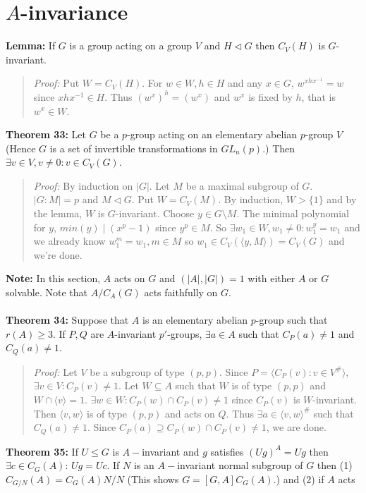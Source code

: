 \section {$A$-invariance}
{\bf Lemma:}
If $G$ is a group acting on a group $V$ and $H \lhd G$ then $C_V(H)$ is $G$-invariant.
\begin{quote}
\emph{Proof:}  Put $W= C_V(H)$.  For $w \in W, h \in H$ and any $x \in G$, $w^{xhx^{-1}} = w$ since
$xhx^{-1} \in H$.  Thus  $(w^x)^h = (w^x)$ and $w^x$ is fixed by $h$, that is $w^x \in W$.
\end{quote}
{\bf Theorem 33:}
Let $G$ be a $p$-group acting on an elementary abelian $p$-group $V$ (Hence $G$ is a set of
invertible transformations in $GL_n(p)$.)  Then $\exists v \in V, v \ne 0: v \in C_V(G)$.
\begin{quote}
\emph{Proof:}  By induction on $|G|$.  Let $M$ be a maximal subgroup of $G$.  $|G:M|= p$ and $M \lhd G$.
Put $W= C_V(M)$.  By induction, $W > \{1 \}$ and by the lemma, $W$ is $G$-invariant.
Choose $y \in G \setminus M$.  The minimal polynomial for $y$, $min(y) \mid (x^p-1)$ since
$y^p \in M$.  So $\exists w_1 \in W, w_1 \ne 0: w_1^y = w_1$ and we already know
$w_1^m = w_1, m \in M$ so $w_1 \in C_V( \langle y, M \rangle)= C_V(G)$ and we're done.
\end{quote}
{\bf Note:} In this section, $A$ acts on $G$ and $(|A|, |G|)=1$ with either
$A$ or $G$ solvable.  Note that $A/C_A(G)$ acts faithfully on $G$.
\\
\\
{\bf Theorem 34:}
Suppose that $A$ is an elementary abelian $p$-group such that $r(A) \ge 3$.  If $P, Q$ are
$A$-invariant $p'$-groups, $\exists a \in A$ such that
$C_P(a) \ne 1$ and $C_Q(a) \ne 1$.
\begin{quote}
\emph{Proof:}  Let $V$ be a subgroup of type $(p, p)$.  Since
$P= \langle C_P(v): v \in V^{\#} \rangle$, $\exists v \in V: C_P(v) \ne 1$.  Let
$W \subseteq A$ such that $W$ is of type $(p, p)$ and $W \cap \langle v \rangle = 1$.
$\exists w \in W: C_P(w) \cap C_P(v) \ne 1$ since $C_P(v)$ is $W$-invariant.
Then $\langle v, w \rangle$ is of type $(p, p)$ and acts on $Q$.  Thus $\exists a \in \langle v, w \rangle^{\#}$ such that  $C_Q(a) \ne 1$.
Since $C_P(a) \supseteq C_P(w) \cap C_P(v) \ne 1$, we are done.
\end{quote}
{\bf Theorem 35:}
If $U \leq G$ is $A-$invariant and $g$ satisfies $(Ug)^A=Ug$ then
$\exists c \in C_G(A)$: $Ug=Uc$. If $N$ is an $A-$invariant normal subgroup of $G$ then
(1) $C_{G/N}(A)= C_G(A)N/N$ (This shows $G=[G,A]C_G(A)$.) and (2) if $A$ acts
